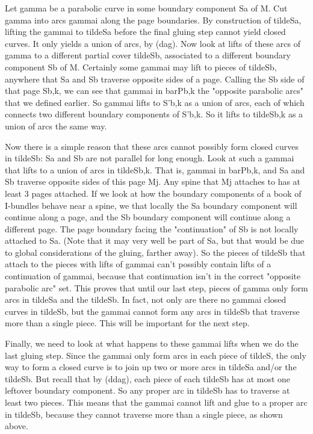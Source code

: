 \documentclass[12pt]{amsart}
\theoremstyle{definition}
\theoremstyle{remark}
\begin{document}
Let gamma be a parabolic curve in some boundary component Sa of M. Cut gamma
into arcs gammai along the page boundaries. By construction of tildeSa, lifting
the gammai to tildeSa before the final gluing step cannot yield closed curves.
It only yields a union of arcs, by (dag). Now look at lifts of these arcs of
gamma to a different partial cover tildeSb, associated to a different boundary
component Sb of M. Certainly some gammai may lift to pieces of tildeSb,
anywhere that Sa and Sb traverse opposite sides of a page. Calling the Sb side
of that page Sb,k, we can see that gammai in barPb,k the "opposite parabolic
arcs" that we defined earlier. So gammai lifts to S'b,k as a union of arcs,
each of which connects two different boundary components of S'b,k. So it lifts
to tildeSb,k as a union of arcs the same way.

Now there is a simple reason that these arcs cannot possibly form closed curves
in tildeSb: Sa and Sb are not parallel for long enough. Look at such a gammai
that lifts to a union of arcs in tildeSb,k.  That is, gammai in barPb,k, and Sa
and Sb traverse opposite sides of this page Mj. Any spine that Mj attaches to
has at least 3 pages attached. If we look at how the boundary components of
a book of I-bundles behave near a spine, we that locally the Sa boundary
component will continue along a page, and the Sb boundary component will
continue along a different page. The page boundary facing the "continuation" of
Sb is not locally attached to Sa. (Note that it may very well be part of Sa,
but that would be due to global considerations of the gluing, farther away). So
the pieces of tildeSb that attach to the pieces with lifts of gammai can't
possibly contain lifts of a continuation of gammai, because that continuation
isn't in the correct "opposite parabolic arc" set. This proves that until our
last step, pieces of gamma only form arcs in tildeSa and the tildeSb. In fact,
not only are there no gammai closed curves in tildeSb, but the gammai cannot
form any arcs in tildeSb that traverse more than a single piece. This will be
important for the next step.

Finally, we need to look at what happens to these gammai lifts when we do the
last gluing step. Since the gammai only form arcs in each piece of tildeS, the
only way to form a closed curve is to join up two or more arcs in tildeSa
and/or the tildeSb.  But recall that by (ddag), each piece of each tildeSb has
at most one leftover boundary component. So any proper arc in tildeSb has to
traverse at least two pieces. This means that the gammai cannot lift and glue
to a proper arc in tildeSb, because they cannot traverse more than a single
piece, as shown above.
\end{document}
